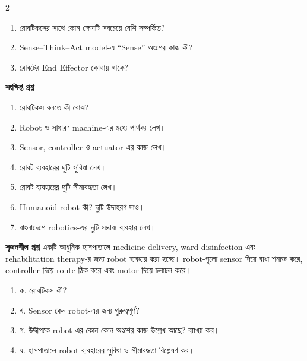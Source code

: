 \begin{practicebox}
\begin{multicols}{2}
\begin{enumerate}
\item \begin{minipage}[t]{\linewidth}রোবটিকসের সাথে কোন ক্ষেত্রটি সবচেয়ে বেশি সম্পর্কিত?\par {}\par\end{minipage}

\item \begin{minipage}[t]{\linewidth}Sense--Think--Act model-এ ``Sense'' অংশের কাজ কী?\par {}\par\end{minipage}

\item \begin{minipage}[t]{\linewidth}রোবটের End Effector কোথায় থাকে?\par {}\par\end{minipage}
\end{enumerate}\end{multicols}

\textbf{সংক্ষিপ্ত প্রশ্ন}
\begin{enumerate}
\item রোবটিকস বলতে কী বোঝ?
\item Robot ও সাধারণ machine-এর মধ্যে পার্থক্য লেখ।
\item Sensor, controller ও actuator-এর কাজ লেখ।
\item রোবট ব্যবহারের দুটি সুবিধা লেখ।
\item রোবট ব্যবহারের দুটি সীমাবদ্ধতা লেখ।
\item Humanoid robot কী? দুটি উদাহরণ দাও।
\item বাংলাদেশে robotics-এর দুটি সম্ভাব্য ব্যবহার লেখ।
\end{enumerate}

\textbf{সৃজনশীল প্রশ্ন}
একটি আধুনিক হাসপাতালে medicine delivery, ward disinfection এবং rehabilitation therapy-র জন্য robot ব্যবহার করা হচ্ছে। robot-গুলো sensor দিয়ে বাধা শনাক্ত করে, controller দিয়ে route ঠিক করে এবং motor দিয়ে চলাচল করে।

\begin{enumerate}
\item ক. রোবটিকস কী?
\item খ. Sensor কেন robot-এর জন্য গুরুত্বপূর্ণ?
\item গ. উদ্দীপকে robot-এর কোন কোন অংশের কাজ উল্লেখ আছে? ব্যাখ্যা কর।
\item ঘ. হাসপাতালে robot ব্যবহারের সুবিধা ও সীমাবদ্ধতা বিশ্লেষণ কর।
\end{enumerate}
\end{practicebox}

